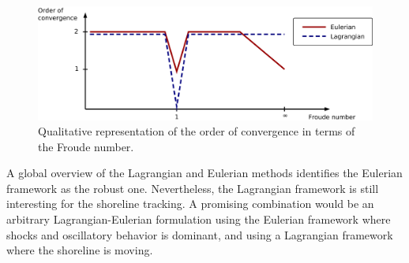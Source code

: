 \begin{figure}
    \centering
    \includegraphics[width=\textwidth]{img/lagrangian/pfem_euler_convergence.png}
    \caption{Qualitative representation of the order of convergence in terms of the Froude number.}
    \label{pfem_euler_convergence}
\end{figure}


A global overview of the Lagrangian and Eulerian methods identifies the Eulerian framework as the robust one. Nevertheless, the Lagrangian framework is still interesting for the shoreline tracking.
A promising combination would be an arbitrary Lagrangian-Eulerian formulation using the Eulerian framework where shocks and oscillatory behavior is dominant, and using a Lagrangian framework where the shoreline is moving.

